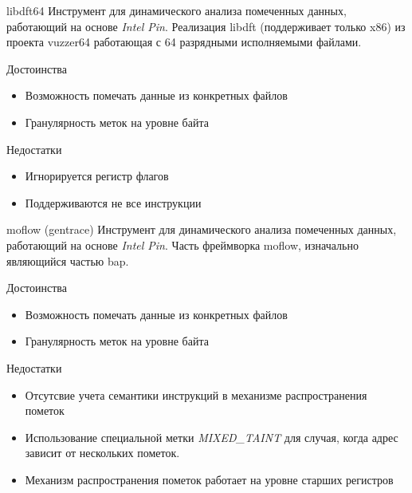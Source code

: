 \documentclass[10pt]{beamer}
\begin{document}
\begin{frame}{libdft64}
    Инструмент для динамического анализа помеченных данных, работающий на основе \emph{Intel Pin}. Реализация libdft (поддерживает только x86) из проекта vuzzer64 работающая с 64 разрядными исполняемыми файлами. 
    \begin{block}{Достоинства}
      \begin{itemize}
        \item Возможность помечать данные из конкретных файлов
        \item Гранулярность меток на уровне байта
      \end{itemize}
    \end{block}
        \begin{block}{Недостатки}
          \begin{itemize}
      \item Игнорируется регистр флагов
      \item Поддерживаются не все инструкции
      \end{itemize}
    \end{block}
\end{frame}


\begin{frame}{moflow (gentrace)}
    Инструмент для динамического анализа помеченных данных, работающий на основе \emph{Intel Pin}.
    Часть фреймворка moflow, изначально являющийся частью bap.
    \begin{block}{Достоинства}
      \begin{itemize}
        \item Возможность помечать данные из конкретных файлов
        \item Гранулярность меток на уровне байта
      \end{itemize}
    \end{block}
        \begin{block}{Недостатки}
          \begin{itemize}
      \item Отсутсвие учета семантики инструкций в механизме распространения пометок
      \item Использование специальной метки \emph{MIXED\_TAINT} для случая, когда адрес зависит от нескольких пометок.
      \item Механизм распространения пометок работает на уровне старших регистров
      \end{itemize}
    \end{block}
\end{frame}
\end{document}
